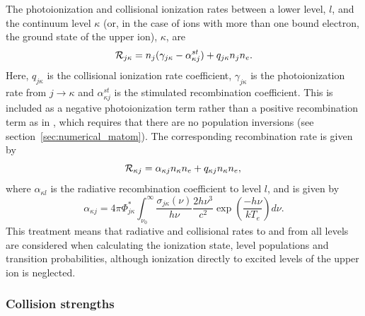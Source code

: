 The photoionization and collisional ionization rates
between a lower level, $l$, and the continuum level $\kappa$ 
(or, in the case of ions with more than one bound electron, 
the ground state of the upper ion),
$\kappa$, are
\begin{equation}
{\cal R}_{j \kappa}= n_j (\gamma_{j\kappa} - \alpha^{st}_{\kappa j})  + q_{j \kappa} n_j n_e.
\end{equation}
Here, $q_{j \kappa}$ is the collisional ionization rate coefficient, 
$\gamma_{j \kappa}$ is the photoionization rate
from $j \rightarrow \kappa$ and $\alpha^{st}_{\kappa j}$ is the stimulated recombination
coefficient. This is included as a negative photoionization term rather 
than a positive recombination term as in \cite{lucy2003}, which requires that there are
no population inversions (see section~\ref{sec:numerical_matom}). 
The corresponding recombination rate is given by 
\begin{equation}
{\cal R}_{\kappa j} = \alpha_{\kappa j} n_{\kappa} n_e + q_{\kappa j}
n_\kappa n_e, \\
\end{equation}
where $\alpha_{\kappa l}$ is the radiative recombination coefficient
to level $l$, and is given by 
\begin{equation}
\alpha_{\kappa j} = 4\pi \Phi^*_{j\kappa} \int^\infty_{\nu_0} 
\frac{\sigma_{j\kappa} (\nu)}{h \nu} \frac{2 h \nu^3}{c^2} 
\exp \left( \frac{- h \nu}{k T_e} \right) d\nu.
\label{eq:alpha_sp}
\end{equation}
This treatment means that radiative and collisional
rates to and from all levels are considered when calculating the
ionization state, level populations and transition probabilities, 
although ionization directly to excited levels of the upper ion is 
neglected. 

\subsubsection{Collision strengths}
\label{sec:coll}

